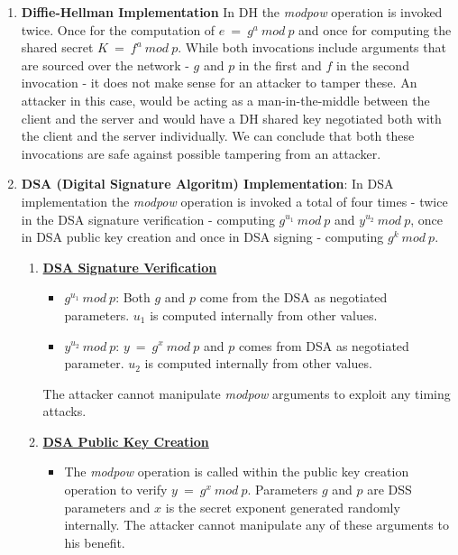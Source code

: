 \documentclass{report}
\begin{document}
\begin{enumerate}
    \item \textbf {Diffie-Hellman Implementation}
    In DH the \textit{modpow} operation is invoked twice. Once for the computation of \(e\ =\ g^a\ mod\ p\) and once for computing the shared secret \(K\ =\ f^a\ mod\ p\). While both invocations include arguments that are sourced over the network - \(g\) and \(p\) in the first and \(f\) in the second invocation - it does not make sense for an attacker to tamper these. An attacker in this case, would be acting as a man-in-the-middle between the client and the server and would have a DH shared key negotiated both with the client and the server individually. We can conclude that both these invocations are safe against possible tampering from an attacker.
    \item \textbf {DSA (Digital Signature Algoritm) Implementation}: 
    In DSA implementation the \textit{modpow} operation is invoked a total of four times - twice in the DSA signature verification - computing \(g^{u_1} \ mod \ p \) and \(y^{u_2}\ mod \ p\), once in DSA public key creation and once in DSA signing - computing \(g^k \ mod \ p\).\par
        \begin{enumerate}
        \item \textbf \underline{DSA Signature Verification}    \begin{itemize}
            \item {\(g^{u_1} \ mod \ p \)}: Both \(g\) and \(p\) come from the DSA as negotiated parameters. \(u_1\) is computed internally from other values.
            \item {\(y^{u_2} \ mod \ p \)}: \(y\ = \ g^x\ mod \ p\) and \(p\) comes from DSA as negotiated parameter. \(u_2\) is computed internally from other values.
         \end{itemize}
        The attacker cannot manipulate \textit{modpow} arguments to exploit any timing attacks.
        \item \textbf \underline{DSA Public Key Creation}
        \begin{itemize}
        \item
        The \textit{modpow} operation is called within the public key creation operation to verify \(y \ =\ g^x \ mod \ p\). Parameters \(g\) and \(p\) are DSS parameters and \(x\) is the secret exponent generated randomly internally. The attacker cannot manipulate any of these arguments to his benefit.
        \end{itemize}

\end{enumerate}
\end{enumerate}
\end{document}
